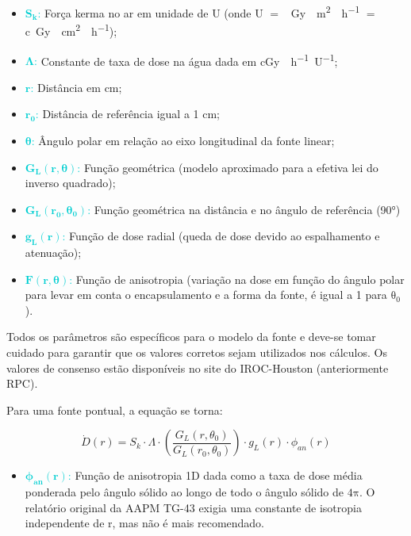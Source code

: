 \documentclass[11pt,a4paper]{article}
\newcounter{exemplo}
\begin{document}
	\begin{exemplo}[onde:]
		\begin{itemize}[label=\textcolor{CarnationPink}{$\star$}]
			\item \textcolor{DarkTurquoise}{$\mathbf{S_{k}}$:} Força kerma no ar em unidade de U (onde U $=$ \unit{\mu Gy \; m^2 \; h^{-1}} $=$ \unit{c Gy \; cm^2 \; h^{-1}});
			\item \textcolor{DarkTurquoise}{$\mathbf{\Lambda}$:} Constante de taxa de dose na água dada em \unit{cGy \; h^{-1} U^{-1}};
			\item \textcolor{DarkTurquoise}{$\mathbf{r}$:} Distância em cm;
			\item \textcolor{DarkTurquoise}{$\mathbf{r_0}$:} Distância de referência igual a 1 cm;
			\item \textcolor{DarkTurquoise}{$\mathbf{\theta}$:} Ângulo polar em relação ao eixo longitudinal da fonte linear;
			\item \textcolor{DarkTurquoise}{$\mathbf{G_{L}(r, \theta)}$:} Função geométrica (modelo aproximado para a efetiva lei do inverso quadrado);
			\item \textcolor{DarkTurquoise}{$\mathbf{G_{L}(r_0, \theta_0)}$:} Função geométrica na distância e no ângulo de referência (\ang{90})
			\item \textcolor{DarkTurquoise}{$\mathbf{ g_{L}(r)}$:} Função de dose radial (queda de dose devido ao espalhamento e atenuação);
			\item \textcolor{DarkTurquoise}{$\mathbf{ F(r, \theta)}$:} Função de anisotropia (variação na dose em função do ângulo polar para levar em conta o encapsulamento e a forma da fonte, é igual a 1 para $\mathrm{\theta_0}$).
		\end{itemize}
	\end{exemplo}

	Todos os parâmetros são específicos para o modelo da fonte e deve-se tomar cuidado para garantir que os valores corretos sejam utilizados nos cálculos. Os valores de consenso estão disponíveis no site do IROC-Houston (anteriormente RPC).
	
	Para uma fonte pontual, a equação se torna:

	$$\dot{D} (r) = S_{k} \cdot \Lambda \cdot \left(\frac{G_{L}(r, \theta_0)}{G_{L}(r_0, \theta_0)}\right) \cdot g_{L}(r) \cdot \phi_{an}(r)$$

	\begin{exemplo}[onde:]
		\begin{itemize}[label=\textcolor{CarnationPink}{$\star$}]
			\item \textcolor{DarkTurquoise}{$\mathbf{\phi_{an}(r)}$:} Função de anisotropia 1D dada como a taxa de dose média ponderada pelo ângulo sólido ao longo de todo o ângulo sólido de $\mathrm{4\pi}$. O relatório original da AAPM TG-43 exigia uma constante de isotropia independente de r, mas não é mais recomendado.
		\end{itemize}		
	\end{exemplo}
\end{document}
